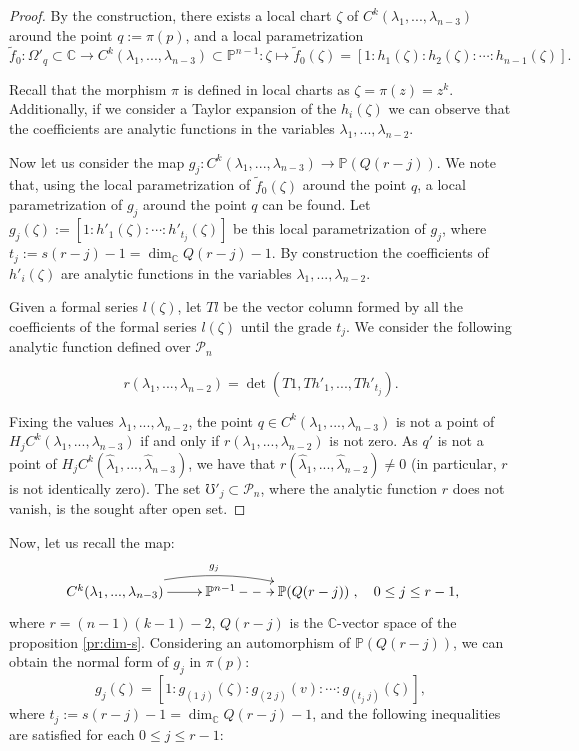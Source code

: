 \documentclass{amsart}
\newcommand{\HC}[4]{\ensuremath{H_{#1}C^{#2}(#4_1,...,#4_{#3})}}
\newcommand{\C}[3]{\ensuremath{C^{#1}(#3_1,...,#3_{#2})}}
\begin{document}
\begin{proof}
By the construction, there exists a local chart $\zeta$ of $\C{k}{n-3}{\lambda}$ around the point $q:=\pi(p)$, and a local parametrization 
$$\tilde{f}_0:\Omega'_q\subset {\mathbb{C}}\rightarrow \C{k}{n-3}{\lambda}\subset {\mathbb{P}}^{n-1}:\zeta\mapsto \tilde{f}_0(\zeta)=[1:h_1(\zeta):h_2(\zeta): \cdots: h_{n-1}(\zeta)].$$ 


Recall that the morphism $\pi$ is defined in local charts as $\zeta=\pi(z)=z^k$.  Additionally, 
if we consider a Taylor expansion of the $h_i(\zeta)$  we can observe that the coefficients are analytic  functions in the variables 
$\lambda_1,...,\lambda_{n-2}$.

	
Now let us consider the map $g_{j}:\C{k}{n-3}{\lambda}\rightarrow {\mathbb{P}}(Q(r-j))$. We note that, using the  local parametrization  of $\tilde{f}_0(\zeta)$ around the point $q$, a local parametrization 
 of   $g_{j}$ around the point $q$  can be found. Let  $g_{j}(\zeta):=[1:h'_1(\zeta):\cdots:h'_{t_j}(\zeta)]$  be  this 
 local parametrization of $g_{j}$,  where $t_j:=s(r-j)-1= 
 \dim_{{\mathbb{C}}}Q(r-j)-1$.
By construction the coefficients of $h'_i(\zeta)$ are analytic functions in the variables
$\lambda_1,...,\lambda_{n-2}$.


Given a formal series $l(\zeta)$, let $Tl$ be the vector column formed by all the coefficients of the formal series $l(\zeta)$
until the grade $t_j$.  We consider the following analytic function defined over $\mathcal{P}_n$ 

$$r(\lambda_1,...,\lambda_{n-2})=\det(T1,Th'_1,...,Th'_{t_j}).$$
	
Fixing the values  $\lambda_1,...,\lambda_{n-2}$, the point  $q\in \C{k}{n-3}{\lambda}$  is not a point of $\HC{j}{k}{n-3}{\lambda}$ if and only 
if $r(\lambda_1,...,\lambda_{n-2})$ is not zero.  As $q'$ is not a point of $\HC{j}{k}{n-3}{\hat{\lambda}}$,
we have that $r(\hat{\lambda}_1,...,\hat{\lambda}_{n-2})\neq 0$ (in particular, $r$ is not identically zero). 
The set $\mho'_j\subset \mathcal{P}_n$,  where the analytic function $r$ does not vanish, is the sought after open set. 
\end{proof}


Now, let us recall the map:
$$\xymatrix{ \C{k}{n-3}{\lambda} \ar[r] \ar@/^1pc/[rr]^{g_j}&{\mathbb{P}}^{n-1}\ar@{-->}[r]&{\mathbb{P}}(Q(r-j))}, \quad 0\leq j \leq r-1,$$
where $r=(n-1)(k-1)-2$, $Q(r-j)$  is the ${\mathbb{C}}$-vector space of the proposition \ref{pr:dim-s}.
Considering an automorphism of  $ {\mathbb{P}}(Q(r-j))$,  we can obtain the normal form of $g_j$ in $\pi(p)$:
 $$g_{j}(\zeta)=[1:g_{(1\; j)}(\zeta):g_{(2\;j)}(v):\cdots :g_{(t_j\;j)}(\zeta)],$$  
 where $t_j:=s(r-j)-1= \dim_{{\mathbb{C}}}Q(r-j)-1$,  and  the following inequalities are satisfied for each $0\leq j\leq r-1$:
\end{document}
